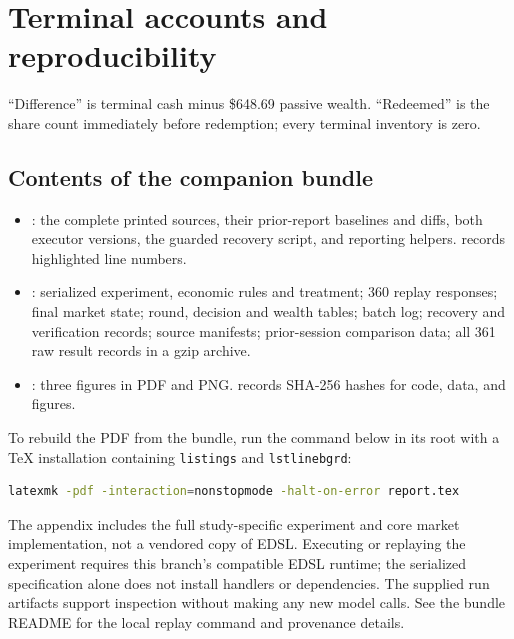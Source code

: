 \documentclass[11pt,letterpaper]{article}
\begin{document}
\clearpage
\section{Terminal accounts and reproducibility}\label{app:accounts}
\begin{center}\small\end{center}
``Difference'' is terminal cash minus \$648.69 passive wealth. ``Redeemed'' is
the share count immediately before redemption; every terminal inventory is zero.

\subsection*{Contents of the companion bundle}
\begin{itemize}
\item {}: the complete printed sources, their prior-report baselines
and diffs, both executor versions, the guarded recovery script, and reporting
helpers.  records highlighted line numbers.
\item {}: serialized experiment, economic rules and treatment;
360 replay responses; final market state; round, decision and wealth tables;
batch log; recovery and verification records; source manifests; prior-session
comparison data; all 361 raw result records in a gzip archive.
\item {}: three figures in PDF and PNG.
 records SHA-256 hashes for code, data, and figures.
\end{itemize}
To rebuild the PDF from the bundle, run the command below in its root with a
TeX installation containing \texttt{listings} and \texttt{lstlinebgrd}:
\begin{lstlisting}[language=bash,numbers=none]
latexmk -pdf -interaction=nonstopmode -halt-on-error report.tex
\end{lstlisting}
The appendix includes the full study-specific experiment and core market
implementation, not a vendored copy of EDSL. Executing or replaying the
experiment requires this branch's compatible EDSL runtime; the serialized
specification alone does not install handlers or dependencies. The supplied
run artifacts support inspection without making any new model calls.
See the bundle README for the local replay command and provenance details.
\end{document}
